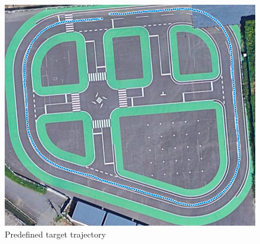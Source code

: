 \begin{figure}[H]
  \centering
 \includegraphics[keepaspectratio, scale=0.3]
      {images/targetpath.png}
 \caption{Predefined target trajectory}
 \label{fig:target path}
\end{figure}

\newpage